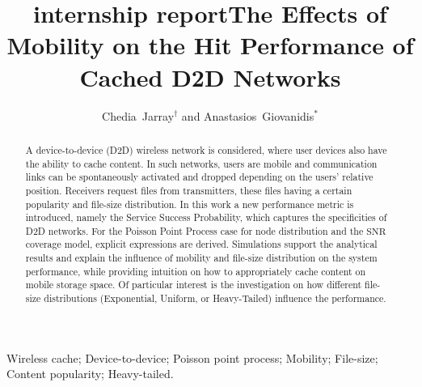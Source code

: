\documentclass[conference]{IEEEtran}
\title{internship report}
\begin{document}
\title{The Effects of Mobility on the Hit Performance of Cached D2D Networks}

\author{Chedia~Jarray$^\dagger$ and Anastasios~Giovanidis$^\ast$\\[2ex]}
\maketitle

\begin{abstract}
A device-to-device (D2D) wireless network is considered, where user devices also have the ability to cache content. In such networks, users are mobile and communication links can be spontaneously activated and dropped depending on the users' relative position. Receivers request files from transmitters, these files having a certain popularity and file-size distribution. In this work a new performance metric is introduced, namely the Service Success Probability, which captures the specificities of D2D networks. For the Poisson Point Process case for node distribution and the $\mathrm{SNR}$ coverage model, explicit expressions are derived. Simulations support the analytical results and explain the influence of mobility and file-size distribution on the system performance, while providing intuition on how to appropriately cache content on mobile storage space. Of particular interest is the investigation on how different file-size distributions (Exponential, Uniform, or Heavy-Tailed) influence the performance.
\end{abstract}

\begin{keywords}
Wireless cache; Device-to-device; Poisson point process; Mobility; File-size; Content popularity; Heavy-tailed.
\end{keywords}

\let\thefootnote\relax{}
\newcommand{\thefootnote}{\arabic{footnote}}
\end{document}
